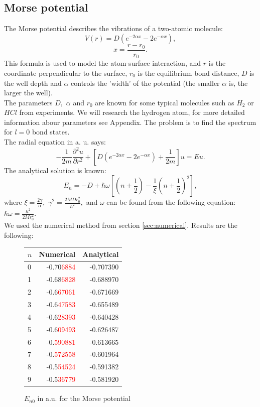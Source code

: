 \documentclass[a4paper, 14pt]{article}
\begin{document}
\subsection{Morse potential}
The Morse potential describes the vibrations of a two-atomic molecule:
\begin{equation}
  V(r) = D(e^{-2\alpha x} - 2e^{-\alpha x}), 
\end{equation}
$$x= \frac{r-r_0}{r_0}.$$
This formula is used to model the atom-surface interaction, and  $r$ is the coordinate perpendicular to the surface, $r_0$ is the equilibrium bond distance, $D$ is the well depth and $\alpha$ controls the 'width' of the potential (the smaller $\alpha$ is, the larger the well). \\
The parameters $D,$ $\alpha$ and $r_0$ are known for some typical molecules such as $H_2$ or $H Cl$ from experiments. We will research the hydrogen atom, for more detailed information abour parameters see Appendix. The problem is to find the spectrum for $l=0$ bond states. \\
The radial equation 
 in a. u.  says:
$$-\frac{1}{2m}\frac{\partial^2 u}{\partial r^2}+[D(e^{-2\alpha x} - 2e^{-\alpha x})+\frac{1}{2m}]u = Eu.$$
The analytical solution is known:
$$E_n = -D + \hbar \omega [(n+\frac{1}{2}) - \frac{1}{\xi}(n+\frac{1}{2})^2],$$
where $\xi = \frac{2 \gamma}{\alpha},$ $\gamma^2 = \frac{2 M D r_0^2}{\hbar^2},$ and $\omega$ can be found from the following equation: $\hbar \omega = \frac{\hbar^2}{2 M  r_0^2}.$\\
We used the numerical method from section \ref{sec:numerical}. Results are the following:
\begin{figure}[h!]
\centering
\begin{tabular}{lrr}
\toprule
$n$ &      Numerical & Analytical \\
\midrule
0 & -0.70\textcolor{red}{6884} & -0.707390 \\
1 & -0.68\textcolor{red}{6828} & -0.688970 \\
2 & -0.6\textcolor{red}{67061} & -0.671669 \\
3 & -0.6\textcolor{red}{47583} & -0.655489 \\
4 & -0.6\textcolor{red}{28393} & -0.640428 \\
5 & -0.6\textcolor{red}{09493} & -0.626487 \\
6 & -0.\textcolor{red}{590881} & -0.613665 \\
7 & -0.\textcolor{red}{572558} & -0.601964 \\
8 & -0.5\textcolor{red}{54524} & -0.591382 \\
9 & -0.5\textcolor{red}{36779} & -0.581920 \\
\bottomrule
\end{tabular}
\caption{$E_{n0}$ in a.u. for the Morse potential}
\label{Mor_spectrum}
\end{figure}
\end{document}
